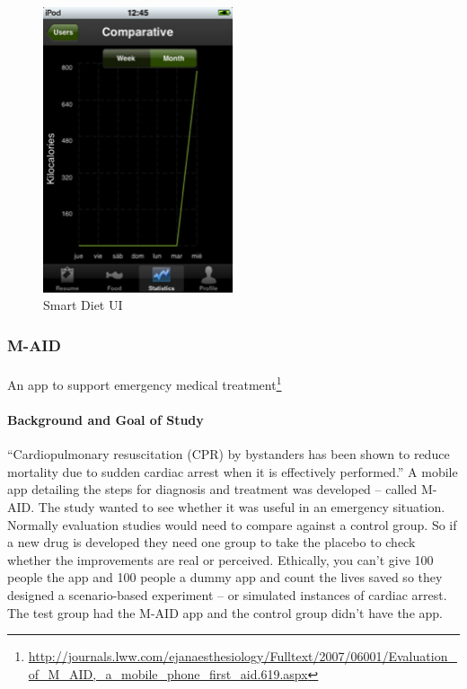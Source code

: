 \begin{figure}[H]
\centering
\includegraphics[width=0.5\textwidth]{images/smart-diet-2}
\caption{Smart Diet UI}
\label{fig:smart-diet-2}
\end{figure}

\subsubsection{M-AID}

\paragraph{} An app to support emergency medical treatment\footnote{\url{http://journals.lww.com/ejanaesthesiology/Fulltext/2007/06001/Evaluation_of_M_AID,_a_mobile_phone_first_aid.619.aspx}}

\paragraph{Background and Goal of Study} ``Cardiopulmonary resuscitation (CPR) by bystanders has been shown to reduce mortality due to sudden cardiac arrest when it is effectively performed.'' A mobile app detailing the steps for diagnosis and treatment was developed – called M-AID. The study wanted to see whether it was useful in an emergency situation.
Normally evaluation studies would need to compare against a control group. So if a new drug is developed they need one group to take the placebo to check whether the improvements are real or perceived.
Ethically, you can’t give 100 people the app and 100 people a dummy app and count the lives saved so they designed a scenario-based experiment – or simulated instances of cardiac arrest. The test group had the M-AID app and the control group didn’t have the app.

